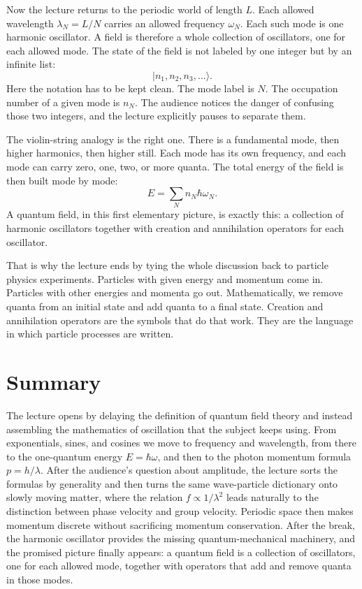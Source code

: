Now the lecture returns to the periodic world of length \(L\). Each allowed wavelength \(\lambda_N=L/N\) carries an allowed frequency \(\omega_N\). Each such mode is one harmonic oscillator. A field is therefore a whole collection of oscillators, one for each allowed mode. The state of the field is not labeled by one integer but by an infinite list:
\begin{equation}
|n_1,n_2,n_3,\dots\rangle.
\end{equation}
Here the notation has to be kept clean. The mode label is \(N\). The occupation number of a given mode is \(n_N\). The audience notices the danger of confusing those two integers, and the lecture explicitly pauses to separate them.

The violin-string analogy is the right one. There is a fundamental mode, then higher harmonics, then higher still. Each mode has its own frequency, and each mode can carry zero, one, two, or more quanta. The total energy of the field is then built mode by mode:
\begin{equation}
E=\sum_{N} n_N \hbar\omega_N.
\end{equation}
A quantum field, in this first elementary picture, is exactly this: a collection of harmonic oscillators together with creation and annihilation operators for each oscillator.

That is why the lecture ends by tying the whole discussion back to particle physics experiments. Particles with given energy and momentum come in. Particles with other energies and momenta go out. Mathematically, we remove quanta from an initial state and add quanta to a final state. Creation and annihilation operators are the symbols that do that work. They are the language in which particle processes are written.

\section{Summary}

The lecture opens by delaying the definition of quantum field theory and instead assembling the mathematics of oscillation that the subject keeps using. From exponentials, sines, and cosines we move to frequency and wavelength, from there to the one-quantum energy \(E=\hbar\omega\), and then to the photon momentum formula \(p=h/\lambda\). After the audience's question about amplitude, the lecture sorts the formulas by generality and then turns the same wave-particle dictionary onto slowly moving matter, where the relation \(f\propto 1/\lambda^2\) leads naturally to the distinction between phase velocity and group velocity. Periodic space then makes momentum discrete without sacrificing momentum conservation. After the break, the harmonic oscillator provides the missing quantum-mechanical machinery, and the promised picture finally appears: a quantum field is a collection of oscillators, one for each allowed mode, together with operators that add and remove quanta in those modes.